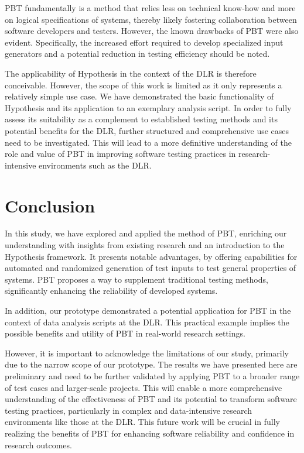 \documentclass[runningheads]{llncs}
\begin{document}
PBT fundamentally is a method that relies less on technical know-how and more on logical specifications of systems, thereby likely fostering collaboration between software developers and testers. However, the known drawbacks of PBT were also evident. Specifically, the increased effort required to develop specialized input generators and a potential reduction in testing efficiency should be noted.

The applicability of Hypothesis in the context of the DLR is therefore conceivable. However, the scope of this work is limited as it only represents a relatively simple use case. We have demonstrated the basic functionality of Hypothesis and its application to an exemplary analysis script. In order to fully assess its suitability as a complement to established testing methods and its potential benefits for the DLR, further structured and comprehensive use cases need to be investigated. This will lead to a more definitive understanding of the role and value of PBT in improving software testing practices in research-intensive environments such as the DLR.

\section{Conclusion}
In this study, we have explored and applied the method of PBT, enriching our understanding with insights from existing research and an introduction to the Hypothesis framework. It presents notable advantages, by offering capabilities for automated and randomized generation of test inputs to test general properties of systems. PBT proposes a way to supplement traditional testing methods, significantly enhancing the reliability of developed systems.

In addition, our prototype demonstrated a potential application for PBT in the context of data analysis scripts at the DLR. This practical example implies the possible benefits and utility of PBT in real-world research settings.

However, it is important to acknowledge the limitations of our study, primarily due to the narrow scope of our prototype. The results we have presented here are preliminary and need to be further validated by applying PBT to a broader range of test cases and larger-scale projects. This will enable a more comprehensive understanding of the effectiveness of PBT and its potential to transform software testing practices, particularly in complex and data-intensive research environments like those at the DLR. This future work will be crucial in fully realizing the benefits of PBT for enhancing software reliability and confidence in research outcomes.

%
%
%
\newpage


\end{document}
